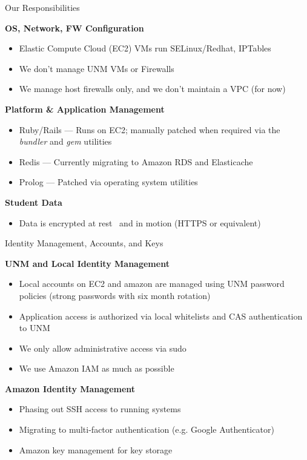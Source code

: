 \documentclass[t,handout]{beamer}   %
\begin{document}
\begin{frame}{Our Responsibilities}

{\small
\textbf{OS, Network, FW Configuration}
\begin{itemize}
\item Elastic Compute Cloud (EC2) VMs run SELinux/Redhat, IPTables
\item We don't manage UNM VMs or Firewalls
\item We manage host firewalls only, and we don't maintain a VPC (for now)
\end{itemize}
}

\pause

\textbf{Platform \& Application Management}
{\small
\begin{itemize}
\item Ruby/Rails --- Runs on EC2; manually patched when required via the \textit{bundler} and \textit{gem} utilities
\item Redis --- Currently migrating to Amazon RDS and Elasticache
\item Prolog --- Patched via operating system utilities
\end{itemize}
}

\pause

\textbf{Student Data}
{\small
\begin{itemize}
\item Data is encrypted at rest~ and in motion (HTTPS or equivalent)
\end{itemize}
}

\end{frame}

\begin{frame}{Identity Management, Accounts, and Keys}

\textbf{UNM and Local Identity Management}
{\small
\begin{itemize}
\item Local accounts on EC2 and amazon are managed using UNM password policies (strong passwords with six month rotation)
\item Application access is authorized via local whitelists and CAS authentication to UNM
\item We only allow administrative access via sudo
\item We use Amazon IAM as much as possible
\end{itemize}
}

\textbf{Amazon Identity Management}
{\small
\begin{itemize}
\item Phasing out SSH access to running systems
\item Migrating to multi-factor authentication (e.g. Google Authenticator)~
\item Amazon key management for key storage
\end{itemize}
}
\end{frame}
\end{document}
